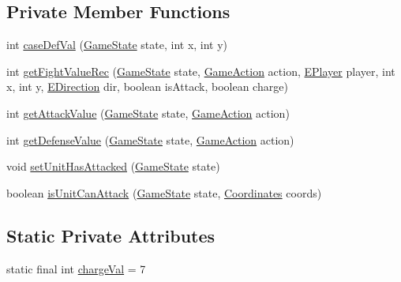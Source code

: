 \subsection*{Private Member Functions}
\begin{DoxyCompactItemize}
\item 
int \mbox{\hyperlink{classrule_engine_1_1rules_1_1master_rules_1_1_attack_rules_ae5503b7c9d28aa2ca0e242b9c2411b89}{case\+Def\+Val}} (\mbox{\hyperlink{classgame_1_1game_state_1_1_game_state}{Game\+State}} state, int x, int y)
\item 
int \mbox{\hyperlink{classrule_engine_1_1rules_1_1master_rules_1_1_attack_rules_ab245cc7a1359f4049b2434184bc44076}{get\+Fight\+Value\+Rec}} (\mbox{\hyperlink{classgame_1_1game_state_1_1_game_state}{Game\+State}} state, \mbox{\hyperlink{classrule_engine_1_1_game_action}{Game\+Action}} action, \mbox{\hyperlink{enumgame_1_1_e_player}{E\+Player}} player, int x, int y, \mbox{\hyperlink{enumgame_1_1board_1_1_e_direction}{E\+Direction}} dir, boolean is\+Attack, boolean charge)
\item 
int \mbox{\hyperlink{classrule_engine_1_1rules_1_1master_rules_1_1_attack_rules_abbf934911508bc5804744745815493d5}{get\+Attack\+Value}} (\mbox{\hyperlink{classgame_1_1game_state_1_1_game_state}{Game\+State}} state, \mbox{\hyperlink{classrule_engine_1_1_game_action}{Game\+Action}} action)
\item 
int \mbox{\hyperlink{classrule_engine_1_1rules_1_1master_rules_1_1_attack_rules_a80c89bcb3fe06834e0c1ef1772a8c71e}{get\+Defense\+Value}} (\mbox{\hyperlink{classgame_1_1game_state_1_1_game_state}{Game\+State}} state, \mbox{\hyperlink{classrule_engine_1_1_game_action}{Game\+Action}} action)
\item 
void \mbox{\hyperlink{classrule_engine_1_1rules_1_1master_rules_1_1_attack_rules_ab487cbbc141d3f0db64c03466e690810}{set\+Unit\+Has\+Attacked}} (\mbox{\hyperlink{classgame_1_1game_state_1_1_game_state}{Game\+State}} state)
\item 
boolean \mbox{\hyperlink{classrule_engine_1_1rules_1_1master_rules_1_1_attack_rules_a77e9058ba68078255c1b8080169ea651}{is\+Unit\+Can\+Attack}} (\mbox{\hyperlink{classgame_1_1game_state_1_1_game_state}{Game\+State}} state, \mbox{\hyperlink{classrule_engine_1_1_coordinates}{Coordinates}} coords)
\end{DoxyCompactItemize}
\subsection*{Static Private Attributes}
\begin{DoxyCompactItemize}
\item 
static final int \mbox{\hyperlink{classrule_engine_1_1rules_1_1master_rules_1_1_attack_rules_aef7304924044302e0b16bae9661e0dfb}{charge\+Val}} = 7
\end{DoxyCompactItemize}
